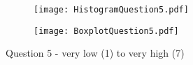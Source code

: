 \begin{figure}[htbp] %
\begin{center} 
\begin{subfigure} 
\centering
\texttt{[image: HistogramQuestion5.pdf]}
\end{subfigure} 
\begin{subfigure} 
\centering
\texttt{[image: BoxplotQuestion5.pdf]}
\end{subfigure}
  \caption[Question 5 - Histogram and Box plot]{Question 5 - very low (1) to very high (7)}
    \label{Question5} 
\end{center}
\end{figure}



